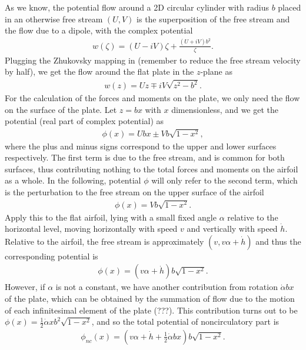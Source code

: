 As we know, the potential flow around a 2D circular cylinder with radius $b$ placed in an otherwise free stream $(U,V)$ is the superposition of the free stream and the flow due to a dipole, with the complex potential
\begin{align}
w(\zeta) = (U-iV)\zeta+\frac{(U+iV)b^2}{\zeta}.
\end{align} 
Plugging the Zhukovsky mapping in (remember to reduce the free stream velocity by half), we get the flow around the flat plate in the $z$-plane as
\begin{align}
w(z) = Uz \mp iV\sqrt{z^2-b^2}.
\end{align} 
For the calculation of the forces and moments on the plate, we only need the flow on the surface of the plate.
Let $z = bx$ with $x$ dimensionless, and we get the potential (real part of complex potential) as
\begin{align}
\phi(x) = Ubx \pm Vb\sqrt{1-x^2},
\end{align} 
where the plus and minus signs correspond to the upper and lower surfaces respectively. 
The first term is due to the free stream, and is common for both surfaces, thus contributing nothing to the total forces and moments on the airfoil as a whole.
In the following, potential $\phi$ will only refer to the second term, which is the perturbation to the free stream on the upper surface of the airfoil
\begin{align}
\phi(x) = Vb\sqrt{1-x^2}.
\end{align} 
Apply this to the flat airfoil, lying with a small fixed angle $\alpha$ relative to the horizontal level, moving horizontally with speed $v$ and vertically with speed $\dot{h}$.
Relative to the airfoil, the free stream is approximately $(v,v\alpha+\dot{h})$ and thus the corresponding potential is
\begin{align}
\phi(x) = (v\alpha + \dot{h})b\sqrt{1-x^2}.
\end{align} 
However, if $\alpha$ is not a constant, we have another contribution from rotation $\dot{\alpha}bx$ of the plate, which can be obtained by the summation of flow due to the motion of each infinitesimal element of the plate (???).
This contribution turns out to be $\phi(x) = \frac{1}{2}\dot{\alpha}xb^2\sqrt{1-x^2}$, and so the total potential of noncirculatory part is
\begin{align}
\phi_{nc}(x) = (v\alpha + \dot{h} + \frac{1}{2}\dot{\alpha}bx) b\sqrt{1-x^2}.
\end{align} 

